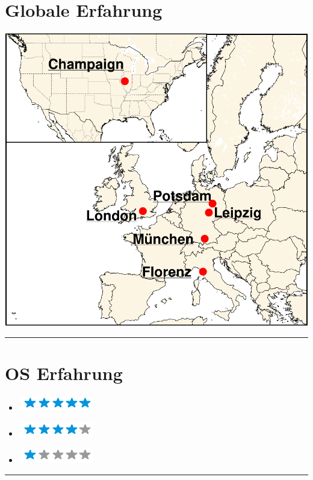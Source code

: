 \documentclass{article}
\begin{document}
\begin{minipage}[t]{0.3\textwidth}
	\centering
	\section*{\hfill \fontsize{18pt}{24pt}\selectfont \color{pblue} Globale Erfahrung \hfill}
	\vspace{-2mm}
	\includegraphics[scale=0.3]{img/globalEXP.pdf}
	\vspace{2mm}
	\hrule
	\vspace{-3mm}
	\section*{\fontsize{18pt}{24pt}\selectfont \color{pblue} OS Erfahrung}
	\vspace{-2mm}
	\begin{itemize}
	\centering
	\item[\textbf{\LARGE \faLinux}]\includegraphics[scale=0.50]{img/5stars.png}\vspace{-2mm}
	\item[\textbf{\LARGE \faWindows}]\includegraphics[scale=0.50]{img/4stars.png}\vspace{-2mm}
    \item[\textbf{\LARGE \faApple}]\includegraphics[scale=0.50]{img/1stars.png}
    \end{itemize}
	\hrule
	\vspace{-2mm}

\end{minipage}
\end{document}

